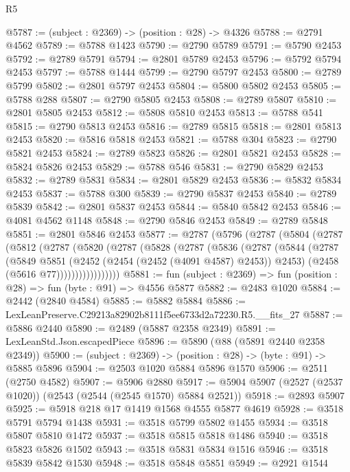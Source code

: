 \begin{lexlean}{R5}
\begin{coremodule}
@5787 := (subject : @2369) -> (position : @28) -> @4326
@5788 := @2791 @4562
@5789 := @5788 @1423
@5790 := @2790 @5789
@5791 := @5790 @2453
@5792 := @2789 @5791
@5794 := @2801 @5789 @2453
@5796 := @5792 @5794 @2453
@5797 := @5788 @1444
@5799 := @2790 @5797 @2453
@5800 := @2789 @5799
@5802 := @2801 @5797 @2453
@5804 := @5800 @5802 @2453
@5805 := @5788 @288
@5807 := @2790 @5805 @2453
@5808 := @2789 @5807
@5810 := @2801 @5805 @2453
@5812 := @5808 @5810 @2453
@5813 := @5788 @541
@5815 := @2790 @5813 @2453
@5816 := @2789 @5815
@5818 := @2801 @5813 @2453
@5820 := @5816 @5818 @2453
@5821 := @5788 @304
@5823 := @2790 @5821 @2453
@5824 := @2789 @5823
@5826 := @2801 @5821 @2453
@5828 := @5824 @5826 @2453
@5829 := @5788 @546
@5831 := @2790 @5829 @2453
@5832 := @2789 @5831
@5834 := @2801 @5829 @2453
@5836 := @5832 @5834 @2453
@5837 := @5788 @300
@5839 := @2790 @5837 @2453
@5840 := @2789 @5839
@5842 := @2801 @5837 @2453
@5844 := @5840 @5842 @2453
@5846 := @4081 @4562 @1148
@5848 := @2790 @5846 @2453
@5849 := @2789 @5848
@5851 := @2801 @5846 @2453
@5877 := @2787
    (@5796
      (@2787
        (@5804
          (@2787
            (@5812
              (@2787
                (@5820
                  (@2787
                    (@5828
                      (@2787
                        (@5836
                          (@2787
                            (@5844
                              (@2787
                                (@5849
                                  @5851
                                  (@2452 (@2454 (@2452 (@4091 @4587) @2453)) @2453)
                                  (@2458 (@5616 @77)))))))))))))))))
@5881 := fun (subject : @2369) => fun (position : @28) => fun (byte : @91) => @4556 @5877
@5882 := @2483 @1020
@5884 := @2442 (@2840 @4584)
@5885 := @5882 @5884
@5886 := LexLeanPreserve.C29213a82902b8111f5ee6733d2a72230.R5.__fits_27
@5887 := @5886 @2440
@5890 := @2489 (@5887 @2358 @2349)
@5891 := LexLeanStd.Json.escapedPiece
@5896 := @5890 (@88 (@5891 @2440 @2358 @2349))
@5900 := (subject : @2369) -> (position : @28) -> (byte : @91) -> @5885 @5896
@5904 := @2503 @1020 @5884 @5896 @1570
@5906 := @2511 (@2750 @4582)
@5907 := @5906 @2880
@5917 := @5904 @5907 (@2527 (@2537 @1020)) (@2543 (@2544 (@2545 @1570) @5884 @2521))
@5918 := @2893 @5907
@5925 := @5918 @218 @17 @1419 @1568 @4555 @5877 @4619
@5928 := @3518 @5791 @5794 @1438
@5931 := @3518 @5799 @5802 @1455
@5934 := @3518 @5807 @5810 @1472
@5937 := @3518 @5815 @5818 @1486
@5940 := @3518 @5823 @5826 @1502
@5943 := @3518 @5831 @5834 @1516
@5946 := @3518 @5839 @5842 @1530
@5948 := @3518 @5848 @5851
@5949 := @2921 @1544

\end{coremodule}
\end{lexlean}
